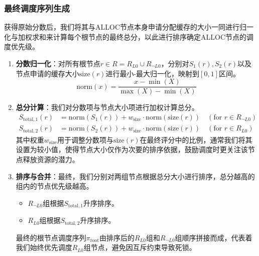\subsubsection{最终调度序列生成}
获得原始分数后，我们将其与ALLOC节点本身申请分配缓存的大小一同进行归一化与加权求和来计算每个根节点的最终总分，以此进行排序确定ALLOC节点的调度优先级。
\begin{enumerate}
    \item \textbf{分数归一化}：对所有根节点$r \in R = R_{L0} \cup R_{\neg L0}$，分别对$S_1(r), S_2(r)$以及节点申请的缓存大小$\text{size}(r)$进行最小-最大归一化，映射到$[0, 1]$区间。
    \[
    \text{norm}(x) = \frac{x - \min(X)}{\max(X) - \min(X)}
    \]
    \item \textbf{总分计算}：我们对分数项与节点大小项进行加权计算总分。
    \begin{align*}
    S_{\text{total},1}(r) &= \text{norm}(S_1(r)) + w_{\text{size}} \cdot \text{norm}(\text{size}(r)) \quad (\text{for } r \in R_{\neg L0}) \\
    S_{\text{total},2}(r) &= \text{norm}(S_2(r)) + w_{\text{size}} \cdot \text{norm}(\text{size}(r)) \quad (\text{for } r \in R_{L0})
    \end{align*}
    其中权重$w_{\text{size}}$用于调整分数项与$\text{size}(r)$在最终评分中的比例，通常我们将其设置为较小值，使得节点大小仅作为次要的排序依据，鼓励调度时更关注该节点释放资源的潜力。
    \item \textbf{排序与合并}：最终，我们分别对两组节点根据总分大小进行排序，总分越高的组内的节点优先级越高。
    \begin{itemize}
        \item $R_{\neg L0}$组根据$S_{\text{total},1}$升序排序。
        \item $R_{L0}$组根据$S_{\text{total},2}$升序排序。
    \end{itemize}
    最终的根节点调度序列$\pi_{\text{root}}$由排序后的$R_{L0}$组和$R_{\neg L0}$组顺序拼接而成，代表着我们始终优先调度$R_{L0}$组节点，避免因互斥约束导致死锁。
\end{enumerate}




